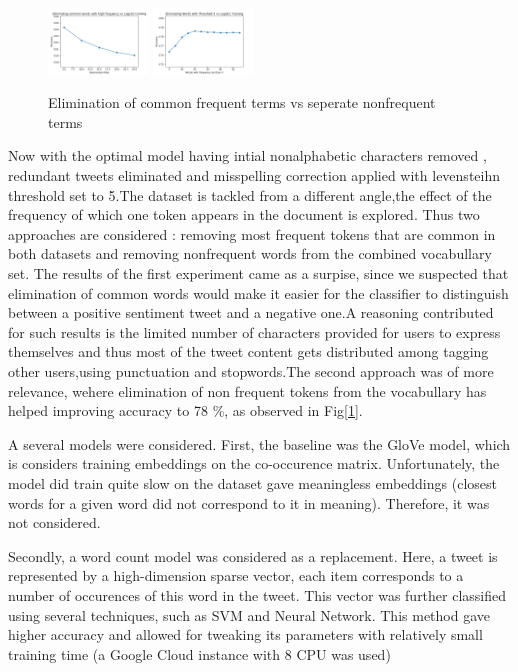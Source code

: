 \documentclass[10pt,conference,compsocconf]{IEEEtran}
\begin{document}
\begin{figure}[!htb]
	\centering \includegraphics[width=100px]{../plots/commonElem.png}
	\centering \includegraphics[width=100px]{../plots/nonfrequent.png}
	\caption{Elimination of common frequent terms vs seperate nonfrequent terms}
	\label{freq}
\end{figure}
Now with the optimal model having intial nonalphabetic characters removed , redundant tweets eliminated and misspelling correction applied with levensteihn threshold set to 5.The dataset is tackled from a different angle,the effect of the frequency of which one token appears in the document is explored. Thus two approaches are considered : removing most frequent tokens that are common in both datasets and removing nonfrequent words from the combined vocabullary set. The results of the first experiment came as a surpise, since we suspected that elimination of common words would make it easier for the classifier to distinguish between a positive sentiment tweet and a negative one.A reasoning contributed for such results is the limited number of characters provided for users to express themselves and thus most of the tweet content gets distributed among tagging other users,using punctuation and stopwords.The second approach was of more relevance, wehere elimination of non frequent tokens from the vocabullary has helped improving accuracy to 78 \%, as observed in Fig[\ref{freq}].    

A several models were considered. First, the baseline was the GloVe \cite{glove} model, which is considers training embeddings on the co-occurence matrix. Unfortunately, the model did train quite slow on the dataset gave meaningless embeddings (closest words for a given word did not correspond to it in meaning). Therefore, it was not considered.

Secondly, a word count model was considered as a replacement. Here, a tweet is represented by a high-dimension sparse vector, each item corresponds to a number of occurences of this word in the tweet. This vector was further classified using several techniques, such as SVM and Neural Network. This method gave higher accuracy and allowed for tweaking its parameters with relatively small training time (a Google Cloud instance with 8 CPU was used)
\end{document}
